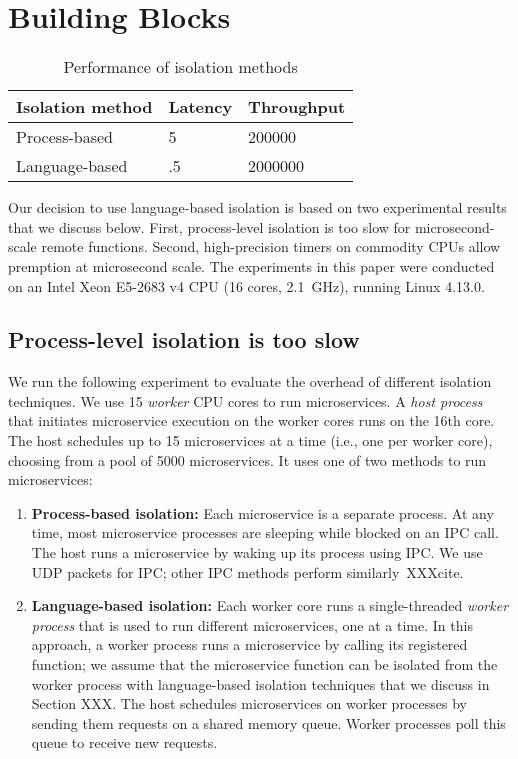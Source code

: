 \section{Building Blocks}
\label{sec:motive}

\begin{table}
\begin{center}
\small
\begin{tabular}{lll}
\textbf{Isolation method} & \textbf{Latency} & \textbf{Throughput} \\
\midrule
Process-based & 5 & 200000 \\
Language-based & .5 & 2000000 \\
\end{tabular}
\caption{Performance of isolation methods}
\label{tab:isolation_methods}
\end{center}
\end{table}

Our decision to use language-based isolation is based on two experimental
results that we discuss below. First, process-level isolation is too slow for
microsecond-scale remote functions. Second, high-precision timers on commodity
CPUs allow premption at microsecond scale. The experiments in this paper were
conducted on an Intel Xeon E5-2683 v4 CPU (16 cores, 2.1~GHz), running
Linux 4.13.0.

\subsection{Process-level isolation is too slow}
We run the following experiment to evaluate the overhead of different isolation
techniques. We use 15 \emph{worker} CPU cores to run microservices. A \emph{host
process} that initiates microservice execution on the worker cores runs on the
16th core. The host schedules up to 15 microservices at a time (i.e., one
per worker core), choosing from a pool of 5000 microservices. It uses one of two
methods to run microservices:

\begin{enumerate}
\item \textbf{Process-based isolation:} Each microservice is a separate process.
At any time, most microservice processes are sleeping while blocked on an IPC
call. The host runs a microservice by waking up its process using IPC. We use
UDP packets for IPC; other IPC methods perform similarly~XXXcite.
\item \textbf{Language-based isolation:} Each worker core runs a single-threaded
\emph{worker process} that is used to run different microservices, one at a time.
In this approach, a worker process runs a microservice by calling its registered
function; we assume that the microservice function can be isolated from the
worker process with language-based isolation techniques that we discuss in
Section XXX. The host schedules microservices on worker processes by sending them
requests on a shared memory queue. Worker processes poll this queue to receive
new requests.
\end{enumerate}

